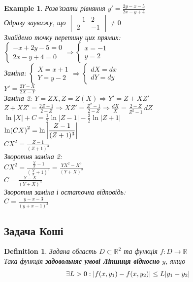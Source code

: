 \documentclass[a4paper, 10pt]{article}
\theoremstyle{theoremdd}
\theoremstyle{theoremdd}
\newtheorem{definition}[theorem]{Definition}
\theoremstyle{theoremdd}
\theoremstyle{theoremdd}
\newtheorem{example}[theorem]{Example}
\theoremstyle{theoremdd}
\theoremstyle{theoremdd}
\theoremstyle{theoremdd}
\theoremstyle{theoremdd}
\begin{document}
	\begin{example}
 Розв'язати рівняння $\displaystyle y' = \frac{2y-x-5}{2x-y+4}$\\
	Одразу зауважу, що $\begin{vmatrix} -1 & 2 \\ 2 & -1 \end{vmatrix} \neq 0$\\
	Знайдемо точку перетину цих прямих:\\
	$\begin{cases}
	- x + 2y - 5 = 0\\
	2 x - y + 4= 0
	\end{cases} \Rightarrow
	\begin{cases}
	x = -1\\
	y = 2
	\end{cases} 
	$\\
	Заміна:
	$\begin{cases}
	X = x + 1\\
	Y = y -2
	\end{cases} \Rightarrow
	\begin{cases}
	dX = dx\\
	dY = dy
	\end{cases}
	$\\
	$\displaystyle Y' = \frac{2Y-X}{2X-Y}$\\
	Заміна 2: $Y=ZX, Z=Z(X) \Rightarrow Y' = Z + XZ'$\\
	$\displaystyle Z + XZ' = \frac{2Z-1}{2-Z} \Rightarrow XZ' = \frac{Z^2-1}{2-Z} \Rightarrow \frac{dX}{X} = \frac{2-Z}{Z^2-1}\,dZ$\\
	$\displaystyle \ln|X| + C= \frac{1}{2} \ln |Z-1| - \frac{3}{2} \ln |Z+1|$\\
	$\displaystyle \ln(CX)^2 = \ln \abs{\frac{Z-1}{(Z+1)^3}}$\\
	$\displaystyle CX^2 = \frac{Z-1}{(Z+1)^3}$\\
	Зворотня заміна 2:\\
	$\displaystyle CX^2 = \frac{\frac{Y}{X}-1}{(\frac{Y}{X}+1)^3} = \frac{YX^2-X^3}{(Y+X)^3}$\\
	$\displaystyle C = \frac{Y-X}{(Y+X)^3}$\\
	Зворотня заміна і остаточна відповідь:\\
	$\displaystyle C = \frac{y-x-3}{(y+x-1)^3}$
	\end{example}
	
	\subsection{Задача Коші}
	\begin{definition}
 Задана область $D \subset \mathbb{R}^2$ та функція $f: D \rightarrow \mathbb{R}$\\
	Така функція \textbf{задовольняє умові Ліпшиця відносно} $y$, якщо
	\begin{align*}
	\exists L>0: \abs{f(x,y_1) - f(x,y_2)} \leq L\abs{y_1-y_2}
	\end{align*}
	\end{definition}
	
\end{document}

